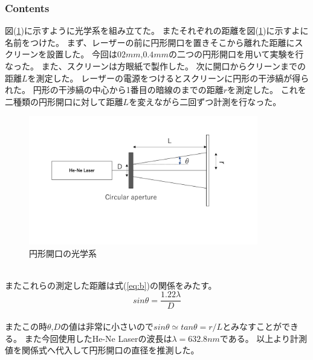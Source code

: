 \documentclass[11pt, a4paper]{jsarticle}
\begin{document}
\subsubsection{Contents}
図(\ref{fig:five})に示すように光学系を組み立てた。
またそれぞれの距離を図(\ref{fig:five})に示すよに名前をつけた。
まず、レーザーの前に円形開口を置きそこから離れた距離にスクリーンを設置した。
今回は$02mm$,$0.4mm$の二つの円形開口を用いて実験を行なった。
また、スクリーンは方眼紙で製作した。
次に開口からクリーンまでの距離$L$を測定した。
レーザーの電源をつけるとスクリーンに円形の干渉縞が得られた。
円形の干渉縞の中心から1番目の暗線のまでの距離$r$を測定した。
これを二種類の円形開口に対して距離$L$を変えながら二回ずつ計測を行なった。
\begin{figure}[htbp]
 \begin{center}
  \includegraphics[width=100mm]{fig5.png}
 \end{center}
 \caption{円形開口の光学系}
 \label{fig:five}
\end{figure}\\

またこれらの測定した距離は式(\ref{eq:b})の関係をみたす。
\begin{equation}
    sin\theta = \frac{1.22\lambda}{D} \label{eq:b}
\end{equation}\\


またこの時$\theta$,$D$の値は非常に小さいので$sin\theta \simeq tan\theta = r/L$とみなすことができる。
また今回使用したHe-Ne Laserの波長は$\lambda = 632.8nm$である。
以上より計測値を関係式へ代入して円形開口の直径を推測した。
\end{document}
